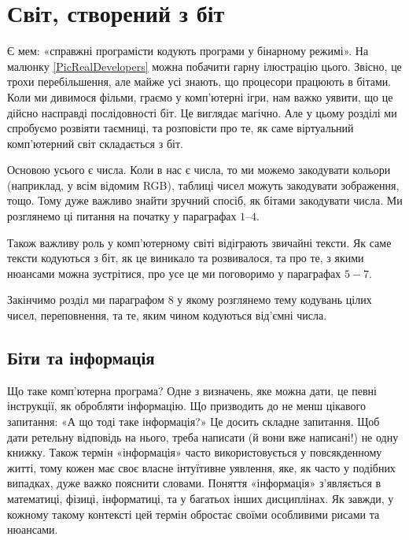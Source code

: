 \chapter{Світ, створений з біт}

Є мем: «справжні програмісти кодують програми у бінарному режимі».
На малюнку \ref{PicRealDevelopers} можна побачити гарну ілюстрацію цього.
Звісно, це трохи перебільшення, але майже усі знають, що процесори працюють в бітами.
Коли ми дивимося фільми, граємо у комп'ютерні ігри, нам важко уявити, що це дійсно насправді послідовності біт.
Це виглядає магічно.
Але у цьому розділі ми спробуємо розвіяти таємниці, та розповісти про те, як саме віртуальний комп'ютерний світ складається з біт.

Основою усього є числа.
Коли в нас є числа, то ми можемо закодувати кольори (наприклад, у всім відомим RGB), таблиці чисел можуть закодувати зображення, тощо.
Тому дуже важливо знайти зручний спосіб, як бітами закодувати числа.
Ми розглянемо ці питання на початку у параграфах $1$--$4$.

Також важливу роль у комп'ютерному світі відіграють звичайні тексти.
Як саме тексти кодуються з біт, як це виникало та розвивалося, та про те, з якими нюансами можна зустрітися, про усе це ми поговоримо у параграфах $5-7$.

Закінчимо розділ ми параграфом $8$ у якому розглянемо тему кодувань цілих чисел, переповнення, та те, яким чином кодуються від'ємні числа.

\vfill
\pagebreak

\section{Біти та інформація}

Що таке комп'ютерна програма?
Одне з визначень, яке можна дати, це певні інструкції, як обробляти інформацію.
Що призводить до не менш цікавого запитання: «А що тоді таке інформація?» 
Це досить складне запитання.
Щоб дати ретельну відповідь на нього, треба написати (й вони вже написані!) не одну книжку.
Також термін «інформація» часто використовується у повсякденному житті, тому кожен має своє власне інтуїтивне уявлення, яке, як часто у подібних випадках, дуже важко пояснити словами.
Поняття «інформація» з'являється в математиці, фізиці, інформатиці, та у багатьох інших дисциплінах.
Як завжди, у кожному такому контексті цей термін обростає своїми особливими рисами та нюансами.

